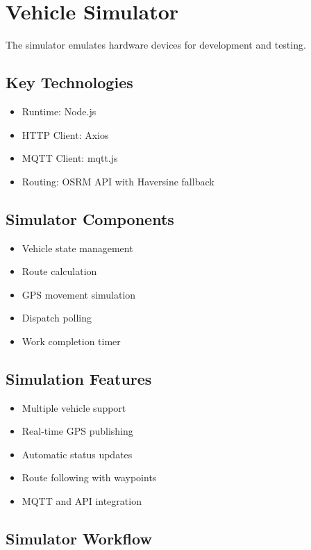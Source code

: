 \section{Vehicle Simulator}

The simulator emulates hardware devices for development and testing.

\subsection{Key Technologies}

\begin{itemize}
    \item Runtime: Node.js
    \item HTTP Client: Axios
    \item MQTT Client: mqtt.js
    \item Routing: OSRM API with Haversine fallback
\end{itemize}

\subsection{Simulator Components}

\begin{itemize}
    \item Vehicle state management
    \item Route calculation
    \item GPS movement simulation
    \item Dispatch polling
    \item Work completion timer
\end{itemize}

\subsection{Simulation Features}

\begin{itemize}
    \item Multiple vehicle support
    \item Real-time GPS publishing
    \item Automatic status updates
    \item Route following with waypoints
    \item MQTT and API integration
\end{itemize}

\subsection{Simulator Workflow}

